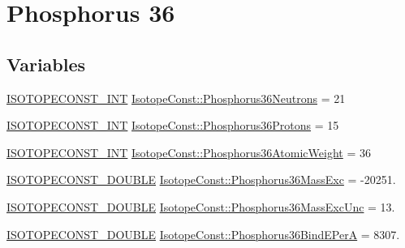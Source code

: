 \hypertarget{group___isotope_const-_phosphorus-_p36}{}\section{Phosphorus 36}
\label{group___isotope_const-_phosphorus-_p36}
\subsection*{Variables}
\begin{DoxyCompactItemize}
\item 
\mbox{\hyperlink{group___isotope_const-_macros_ga5f18360b3e99483a35c32d789e62621c}{I\+S\+O\+T\+O\+P\+E\+C\+O\+N\+S\+T\+\_\+\+I\+NT}} \mbox{\hyperlink{group___isotope_const-_phosphorus-_p36_ga1e608c1303ca95566325f5c88a23bb13}{Isotope\+Const\+::\+Phosphorus36\+Neutrons}} = 21
\item 
\mbox{\hyperlink{group___isotope_const-_macros_ga5f18360b3e99483a35c32d789e62621c}{I\+S\+O\+T\+O\+P\+E\+C\+O\+N\+S\+T\+\_\+\+I\+NT}} \mbox{\hyperlink{group___isotope_const-_phosphorus-_p36_gaecf1e11f3b52f3d39b55834271569297}{Isotope\+Const\+::\+Phosphorus36\+Protons}} = 15
\item 
\mbox{\hyperlink{group___isotope_const-_macros_ga5f18360b3e99483a35c32d789e62621c}{I\+S\+O\+T\+O\+P\+E\+C\+O\+N\+S\+T\+\_\+\+I\+NT}} \mbox{\hyperlink{group___isotope_const-_phosphorus-_p36_ga29cfd1598c3edb2b3d89f3549ee23e60}{Isotope\+Const\+::\+Phosphorus36\+Atomic\+Weight}} = 36
\item 
\mbox{\hyperlink{group___isotope_const-_macros_ga8f45a7272ce02c0b4c65c44636ed719a}{I\+S\+O\+T\+O\+P\+E\+C\+O\+N\+S\+T\+\_\+\+D\+O\+U\+B\+LE}} \mbox{\hyperlink{group___isotope_const-_phosphorus-_p36_gaebbeff69c31275cabcd89f1392d2ea3d}{Isotope\+Const\+::\+Phosphorus36\+Mass\+Exc}} = -\/20251.
\item 
\mbox{\hyperlink{group___isotope_const-_macros_ga8f45a7272ce02c0b4c65c44636ed719a}{I\+S\+O\+T\+O\+P\+E\+C\+O\+N\+S\+T\+\_\+\+D\+O\+U\+B\+LE}} \mbox{\hyperlink{group___isotope_const-_phosphorus-_p36_gabc66973f89be29665633abd198b2af85}{Isotope\+Const\+::\+Phosphorus36\+Mass\+Exc\+Unc}} = 13.
\item 
\mbox{\hyperlink{group___isotope_const-_macros_ga8f45a7272ce02c0b4c65c44636ed719a}{I\+S\+O\+T\+O\+P\+E\+C\+O\+N\+S\+T\+\_\+\+D\+O\+U\+B\+LE}} \mbox{\hyperlink{group___isotope_const-_phosphorus-_p36_gaffd9bf3e3e0a449929a134fe33f63f8e}{Isotope\+Const\+::\+Phosphorus36\+Bind\+E\+PerA}} = 8307.
\item 

\end{DoxyCompactItemize}
